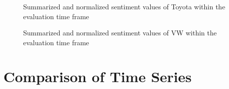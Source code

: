 \begin{figure}[hbt]
    \centering
        
    \caption{Summarized and normalized sentiment values of Toyota within the evaluation time frame}
    \label{fig:analysis-results-toyota}
\end{figure} 

\begin{figure}[hbt]
    \centering
        
    \caption{Summarized and normalized sentiment values of VW within the evaluation time frame}
    \label{fig:analysis-results-vw}
\end{figure} 

\section{Comparison of Time Series}
\label{s:analysis-granger}

